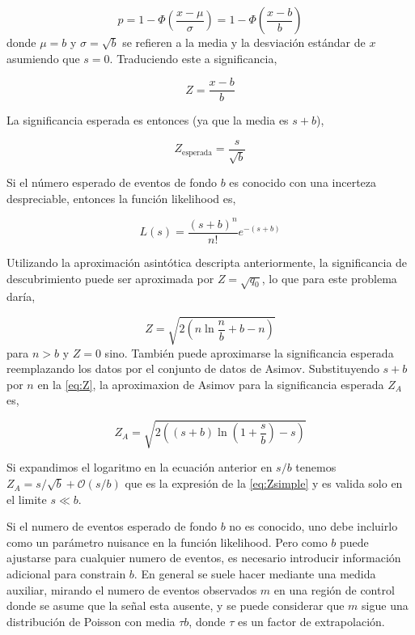 \begin{equation}
  p = 1 - \Phi \left( \frac{x-\mu}{\sigma} \right) = 1 - \Phi \left(
  \frac{x-b}{b} \right)
\end{equation}
%
donde $\mu=b$ y $\sigma = \sqrt{b}$ se refieren a la media y la desviación
estándar de $x$ asumiendo que $s=0$. Traduciendo este {\pvalue} a significancia,

\begin{equation}
  Z = \frac{x-b}{b}
\end{equation}

La significancia esperada es entonces (ya que la media es $s+b$),

\begin{equation}
  Z_\text{esperada} = \frac{s}{\sqrt{b}}
  \label{eq:Zsimple}
\end{equation}

Si el número esperado de eventos de fondo $b$ es conocido con una incerteza
despreciable, entonces la función likelihood es,

\begin{equation}
  L(s) = \frac{(s+b)^n}{n!} e^{-(s+b)}
\end{equation}

Utilizando la aproximación asintótica descripta anteriormente, la significancia
de descubrimiento puede ser aproximada por $Z=\sqrt{q_0}$, lo que para este
problema daría,

\begin{equation}
  Z = \sqrt{2\left( n \ln \frac{n}{b} +b -n \right)}
  \label{eq:Z}
\end{equation}
%
para $n>b$ y $Z=0$ sino. También puede aproximarse la significancia esperada
reemplazando los datos por el conjunto de datos de Asimov. Substituyendo $s+b$
por $n$ en la {\eq} \eqref{eq:Z}, la aproximaxion de Asimov para la
significancia esperada $Z_A$ es,

\begin{equation}
  Z_A = \sqrt{2\left( (s+b) \ln \left( 1 + \frac{s}{b}\right) - s \right)}
\end{equation}

Si expandimos el logaritmo en la ecuación anterior en $s/b$ tenemos $Z_A =
s/\sqrt{b} + \mathcal{O}(s/b)$ que es la expresión de la {\eq}
\eqref{eq:Zsimple} y es valida solo en el limite $s \ll b$.

Si el numero de eventos esperado de fondo $b$ no es conocido, uno debe incluirlo
como un parámetro nuisance en la función likelihood. Pero como $b$ puede
ajustarse para cualquier numero de eventos, es necesario introducir información
adicional para constrain $b$. En general se suele hacer mediante una medida
auxiliar, mirando el numero de eventos observados $m$ en una región de control
donde se asume que la señal esta ausente, y se puede considerar que $m$ sigue
una distribución de Poisson con media $\tau b$, donde $\tau$ es un factor de
extrapolación.

